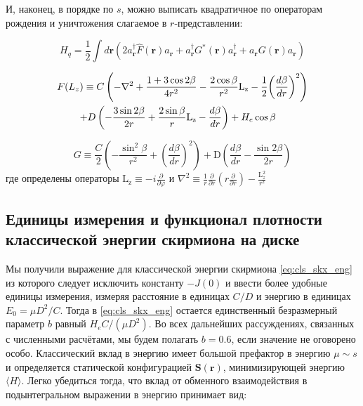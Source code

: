 \documentclass[a4paper,article,14pt]{extarticle}
\begin{document}
И, наконец, в порядке по $s$, можно выписать квадратичное по операторам рождения и уничтожения слагаемое в $r$-представлении:

\begin{equation}
\label{eq:HamQuantBose}
{H_q} = \frac{1}{2}\int {d\mathbf{r} \left( {2a_{\mathbf{r}}^\dag \hat F\left( {\mathbf{r}} \right){a_{\mathbf{r}}} + a_{\mathbf{r}}^\dag G^*\left( {\mathbf{r}} \right)a_{\mathbf{r}}^\dag  + {a_{\mathbf{r}}}{G}\left( {\mathbf{r}} \right){a_{\mathbf{r}}}} \right)}
\end{equation}

\[\begin{gathered}
  F({L_z}) \equiv C\left( { - \nabla ^ 2  + \frac{{1 + 3\cos 2\beta }}{{4{r^2}}} - \frac{{2\cos \beta }}{{{r^2}}}{{\text{L}}_{\text{z}}} - \frac{1}{2}{{\left( {\frac{{d\beta }}{{dr}}} \right)}^2}} \right) \hfill \\
  \,\,\,\,\,\,\,\,\,\,\,\,\,\, + D\left( { - \frac{{3\sin 2\beta }}{{2r}} + \frac{{2\sin \beta }}{r}{{\text{L}}_{\text{z}}} - \frac{{d\beta }}{{dr}}} \right) + H_e \cos \beta  \hfill \\ 
\end{gathered} \]

\[G \equiv \frac{C}{2}\left( { - \frac{{{{\sin }^2}\beta }}{{{r^2}}} + {{\left( {\frac{{d\beta }}{{dr}}} \right)}^2}} \right) + {\text{D}}\left( {\frac{{d\beta }}{{dr}} - \frac{{\sin 2\beta }}{{2r}}} \right)\]
где определены операторы ${{\text{L}}_{\text{z}}} \equiv  - i\frac{\partial }{{\partial \varphi }}$
и 
$\nabla ^ 2  \equiv \frac{1}{r}\frac{\partial }{{\partial r}}\left( {r\frac{\partial }{{\partial r}}} \right) - \frac{{{\text{L}}_z^2}}{{{r^2}}}$ 


\subsection{Единицы измерения и функционал плотности классической энергии скирмиона на диске }
Мы получили выражение для классической энергии скирмиона \eqref{eq:cls_skx_eng} из которого следует исключить константу $-J(0)$ и ввести более удобные единицы измерения, измеряя расстояние в единицах $C/D$ и энергию в единицах $E_{0} = \mu D^{2}/ C$. Тогда в \eqref{eq:cls_skx_eng} остается единственный безразмерный параметр $b$ равный $H_e C/(\mu D^2)$. Во всех дальнейших рассуждениях, связанных с численными расчётами, мы будем полагать $b=0.6$, если значение не оговорено особо.  Классический вклад в энергию имеет большой префактор в энергию $\mu \sim s$ и определяется статической конфигурацией $\mathbf{S}(\mathbf{r}) $, минимизирующей энергию $\langle H\rangle$.  Легко убедиться тогда, что вклад от обменного взаимодействия в подынтегральном выражении в энергию принимает вид:
\end{document}

